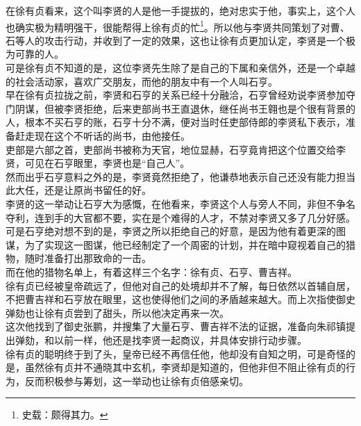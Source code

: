 \begin{multicols}{\theparacolNo}
在徐有贞看来，这个叫李贤的人是他一手提拔的，绝对忠实于他，事实上，这个人也确实极为精明强干，很能帮得上徐有贞的忙\footnote{史载：颇得其力。}。所以他与李贤共同策划了对曹、石等人的攻击行动，并收到了一定的效果，这也让徐有贞更加认定，李贤是一个极为可靠的人。\\

可是徐有贞不知道的是，这位李贤先生除了是自己的下属和亲信外，还是一个卓越的社会活动家，喜欢广交朋友，而他的朋友中有一个人叫石亨。\\

早在徐有贞拉拢之前，李贤和石亨的关系已经十分融洽，石亨曾经劝说李贤参加夺门阴谋，但被李贤拒绝，后来吏部尚书王直退休，继任尚书王翱也是个很有背景的人，根本不买石亨的账，石亨十分不满，便对当时任吏部侍郎的李贤私下表示，准备赶走现在这个不听话的尚书，由他接任。\\

吏部是六部之首，吏部尚书被称为天官，地位显赫，石亨竟肯把这个位置交给李贤，可见在石亨眼里，李贤也是“自己人”。\\

然而出乎石亨意料之外的是，李贤竟然拒绝了，他谦恭地表示自己还没有能力担当此大任，还是让原尚书留任的好。\\

李贤的这一举动让石亨大为感慨，在他看来，李贤这个人与旁人不同，非但不争名夺利，连到手的大官都不要，实在是个难得的人才，不禁对李贤又多了几分好感。\\

可是石亨绝对想不到的是，李贤之所以拒绝自己的好意，是因为他有着更深的图谋，为了实现这一图谋，他已经制定了一个周密的计划，并在暗中窥视着自己的猎物，随时准备打出那致命的一击。\\

而在他的猎物名单上，有着这样三个名字：徐有贞、石亨、曹吉祥。\\

徐有贞已经被皇帝疏远了，但他对自己的处境却并不了解，每日依然以首辅自居，不把曹吉祥和石亨放在眼里，这也使得他们之间的矛盾越来越大。而上次指使御史弹劾也让徐有贞尝到了甜头，所以他决定再来一次。\\

这次他找到了御史张鹏，并搜集了大量石亨、曹吉祥不法的证据，准备向朱祁镇提出弹劾，和以前一样，他还是找李贤一起商议，并具体安排行动步骤。\\

徐有贞的聪明终于到了头，皇帝已经不再信任他，他却没有自知之明，可是奇怪的是，虽然徐有贞并不通晓其中玄机，李贤却是知道的，但他非但不阻止徐有贞的行为，反而积极参与筹划，这一举动也让徐有贞倍感亲切。\\


\end{multicols}

